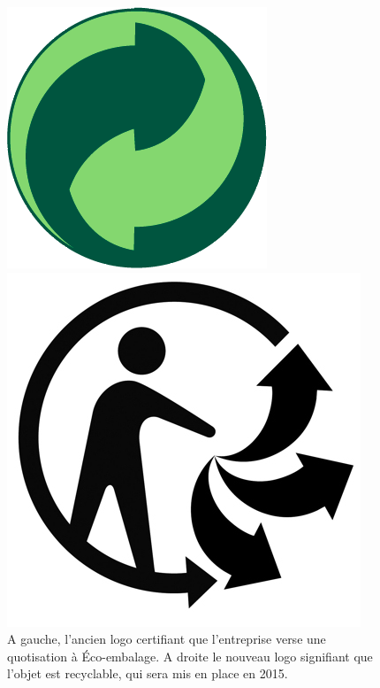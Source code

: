\begin{figure}[h]
\begin{minipage}{0.5\linewidth}
\begin{center}
\includegraphics[scale=0.3]{Rsc/ecoembalage.png} 
\end{center}
\end{minipage}
\begin{minipage}{0.5\linewidth}
\begin{center}
\includegraphics[scale=0.9]{Rsc/triman.jpg} 
\end{center}
\end{minipage}
\caption{\scriptsize{A gauche, l'ancien logo certifiant que l'entreprise verse une quotisation à Éco-embalage. A droite le nouveau logo signifiant que l'objet est recyclable, qui sera mis en place en 2015.}}
\end{figure}

